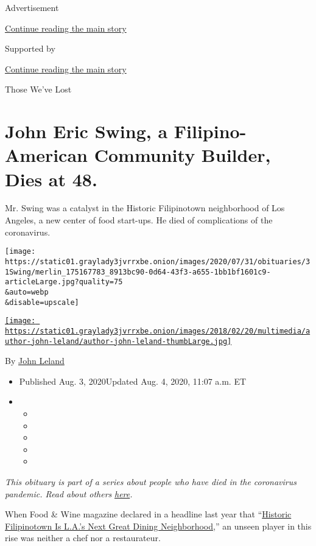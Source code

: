 Advertisement

\protect\hyperlink{after-top}{Continue reading the main story}

Supported by

\protect\hyperlink{after-sponsor}{Continue reading the main story}

Those We've Lost

\hypertarget{john-eric-swing-a-filipino-american-community-builder-dies-at-48}{%
\section{John Eric Swing, a Filipino-American Community Builder, Dies at
48.}\label{john-eric-swing-a-filipino-american-community-builder-dies-at-48}}

Mr. Swing was a catalyst in the Historic Filipinotown neighborhood of
Los Angeles, a new center of food start-ups. He died of complications of
the coronavirus.

\texttt{[image: https://static01.graylady3jvrrxbe.onion/images/2020/07/31/obituaries/31Swing/merlin\_175167783\_8913bc90-0d64-43f3-a655-1bb1bf1601c9-articleLarge.jpg?quality=75\\\&auto=webp\\\&disable=upscale]}

\href{https://www.nytimes3xbfgragh.onion/by/john-leland}{\texttt{[image: https://static01.graylady3jvrrxbe.onion/images/2018/02/20/multimedia/author-john-leland/author-john-leland-thumbLarge.jpg]}}

By \href{https://www.nytimes3xbfgragh.onion/by/john-leland}{John Leland}

\begin{itemize}
\item
  Published Aug. 3, 2020Updated Aug. 4, 2020, 11:07 a.m. ET
\item
  \begin{itemize}
  \item
  \item
  \item
  \item
  \item
  \end{itemize}
\end{itemize}

\emph{This obituary is part of a series about people who have died in
the coronavirus pandemic. Read about others}
\href{https://www.nytimes3xbfgragh.onion/interactive/2020/obituaries/people-died-coronavirus-obituaries.html}{\emph{here}}\emph{.}

When Food \& Wine magazine declared in a headline last year that
``\href{https://www.foodandwine.com/travel/restaurants/historic-filipinotown-restaurants-los-angeles}{Historic
Filipinotown Is L.A.'s Next Great Dining Neighborhood},'' an unseen
player in this rise was neither a chef nor a restaurateur.

